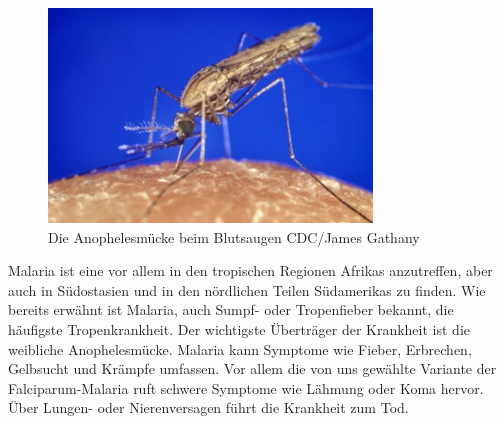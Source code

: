 \documentclass[11pt]{article}
\begin{document}
{        \begin{figure}
            \includegraphics[width=\linewidth]{Anophelesmucke}
            \caption{Die Anophelesmücke beim Blutsaugen CDC/James Gathany}
        \end{figure}
        Malaria ist eine vor allem in den tropischen Regionen Afrikas anzutreffen, aber auch in Südostasien und in den nördlichen Teilen Südamerikas zu finden. Wie bereits erwähnt ist Malaria, auch Sumpf- oder Tropenfieber bekannt, die häufigste Tropenkrankheit. Der wichtigste Überträger der Krankheit ist die weibliche Anophelesmücke. Malaria kann Symptome wie Fieber, Erbrechen, Gelbsucht und Krämpfe umfassen. Vor allem die von uns gewählte Variante der Falciparum-Malaria ruft schwere Symptome wie Lähmung oder Koma hervor. Über Lungen- oder Nierenversagen führt die Krankheit zum Tod.

}
\end{document}
